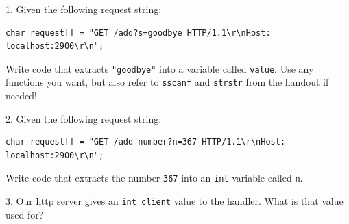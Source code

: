 \documentclass[oneside, landscape]{article}
\begin{document}
\vspace{1em}

1. Given the following request string:

\begin{lstlisting}[numbers=none, basicstyle=\ttfamily\footnotesize]
char request[] = "GET /add?s=goodbye HTTP/1.1\r\nHost: localhost:2900\r\n";
\end{lstlisting}

Write code that extracts \texttt{"goodbye"} into a variable called
\texttt{value}. Use any functions you want, but also refer to {\tt sscanf} and
{\tt strstr} from the handout if needed!

\vspace{3em}

2. Given the following request string:

\begin{lstlisting}[numbers=none, basicstyle=\ttfamily\footnotesize]
char request[] = "GET /add-number?n=367 HTTP/1.1\r\nHost: localhost:2900\r\n";
\end{lstlisting}

Write code that extracts the number \texttt{367} into an \texttt{int} variable called \texttt{n}.

\vspace{3em}

3. Our http server gives an \lstinline{int client} value to the handler. What
is that value used for?



\newpage

\end{document}
